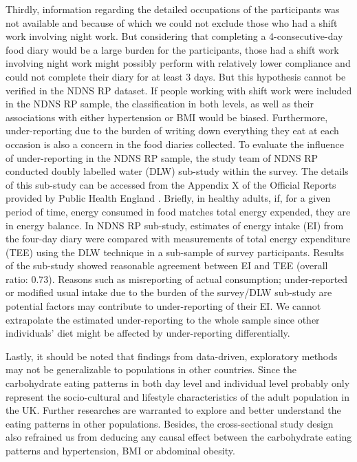 Thirdly, information regarding the detailed occupations of the participants was not available and because of which we could not exclude those who had a shift work involving night work. But considering that completing a 4-consecutive-day food diary would be a large burden for the participants, those had a shift work involving night work might possibly perform with relatively lower compliance and could not complete their diary for at least 3 days. But this hypothesis cannot be verified in the NDNS RP dataset. If people working with shift work were included in the NDNS RP sample, the classification in both levels, as well as their associations with either hypertension or BMI would be biased. Furthermore, under-reporting due to the burden of writing down everything they eat at each occasion is also a concern in the food diaries collected. To evaluate the influence of under-reporting in the NDNS RP sample, the study team of NDNS RP conducted doubly labelled water (DLW) sub-study within the survey. The details of this sub-study can be accessed from the Appendix X of the Official Reports provided by Public Health England \parencite{bates2014national,roberts2018national,NDNSofficial}. Briefly, in healthy adults, if, for a given period of time, energy consumed in food matches total energy expended, they are in energy balance. In NDNS RP sub-study, estimates of energy intake (EI) from the four-day diary were compared with measurements of total energy expenditure (TEE) using the DLW technique in a sub-sample of survey participants. Results of the sub-study showed reasonable agreement between EI and TEE (overall ratio: 0.73). Reasons such as misreporting of actual consumption; under-reported or modified usual intake due to the burden of the survey/DLW sub-study are potential factors may contribute to under-reporting of their EI. We cannot extrapolate the estimated under-reporting to the whole sample since other individuals' diet might be affected by under-reporting differentially. 

Lastly, it should be noted that findings from data-driven, exploratory methods may not be
generalizable to populations in other countries. Since the carbohydrate eating patterns in both day level and individual level probably only represent the socio-cultural and lifestyle characteristics of the adult population in the UK. Further researches are warranted to explore and better understand the eating patterns in other populations. Besides, the cross-sectional study design also refrained us from deducing any causal effect between the carbohydrate eating patterns and hypertension, BMI or abdominal obesity. 

